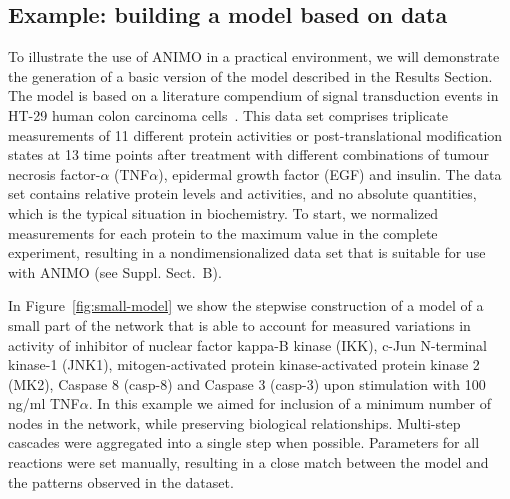 \documentclass{bmcart}
\begin{document}
\subsection*{Example: building a model based on data}\label{subsec:case-study}
To illustrate the use of ANIMO in a practical environment, we will demonstrate the generation of a basic
version of the model described in the Results Section. The model is based on a literature compendium of
signal transduction events in HT-29 human colon carcinoma cells~\cite{pathway-compendium}. This data set comprises triplicate
measurements of 11 different protein activities or post-translational modification states at 13 time points after
treatment with different combinations of tumour necrosis factor-$\alpha$ (TNF$\alpha$), epidermal growth factor (EGF) and insulin.
The data set contains relative protein levels and activities, and no absolute quantities, which is the typical situation in biochemistry.
To start, we normalized measurements for each protein to the
maximum value in the complete experiment, resulting in a nondimensionalized data set that is suitable for use with ANIMO (see Suppl. Sect.~B).




In Figure~\ref{fig:small-model} we show the stepwise construction of a model of a small part of the network that is
able to account for measured variations in activity of inhibitor of nuclear factor kappa-B kinase (IKK), c-Jun N-terminal kinase-1 (JNK1),
mitogen-activated protein kinase-activated protein kinase 2 (MK2), Caspase 8 (casp-8) and Caspase 3 (casp-3) upon stimulation with 100
ng/ml TNF$\alpha$. In this example we aimed for inclusion of a minimum number of nodes in the network, while preserving biological relationships.
Multi-step cascades were aggregated into a single step when possible. Parameters for all reactions were set manually, resulting in a close
match between the model and the patterns observed in the dataset.











\end{document}
